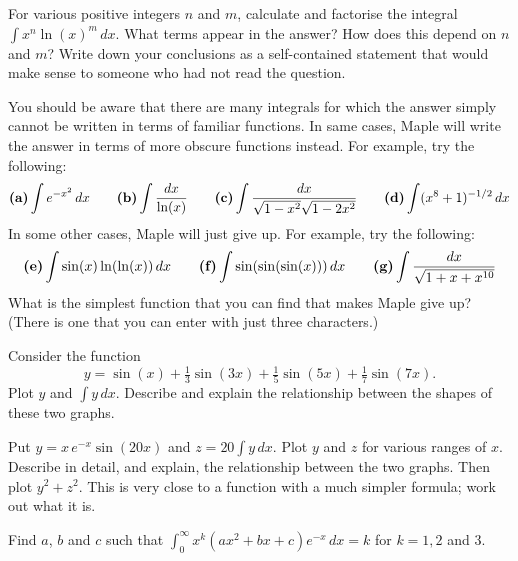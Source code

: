 \documentclass[a4paper,10pt]{amsbook}
\numberwithin{example}{chapter}
\begin{document}
\begin{exercise}
 For various positive integers $n$ and $m$, calculate and
 factorise the integral $\int x^n\ln(x)^m\,dx$.  What terms
 appear in the answer?  How does this depend on $n$ and $m$?
 Write down your conclusions as a self-contained statement
 that would make sense to someone who had not read the
 question. 
\end{exercise}

\begin{exercise}
 You should be aware that there are many integrals for which
 the answer simply cannot be written in terms of familiar
 functions.  In same cases, Maple will write the answer in
 terms of more obscure functions instead.  For example, try
 the following:
 \[ \text{\bf (a)} \int e^{-x^2}\,dx \hspace{2em}
    \text{\bf (b)} \int \frac{dx}{\ln(x)} \hspace{2em}
    \text{\bf (c)} \int \frac{dx}{\sqrt{1-x^2}\sqrt{1-2x^2}} \hspace{2em}
    \text{\bf (d)} \int (x^8+1)^{-1/2}\,dx
 \]
 In some other cases, Maple will just give up.  For example,
 try the following:
 \[ \text{\bf (e)} \int \sin(x)\ln(\ln(x))\,dx \hspace{2em}
    \text{\bf (f)} \int \sin(\sin(\sin(x)))\,dx \hspace{2em}
    \text{\bf (g)} \int \frac{dx}{\sqrt{1+x+x^{10}}}
 \]
 What is the simplest function that you can find that makes
 Maple give up?  (There is one that you can enter with just
 three characters.)
\end{exercise}

\begin{exercise}
 Consider the function
 \[ y = \sin(x) + \tfrac{1}{3}\sin(3x) +
        \tfrac{1}{5}\sin(5x) + \tfrac{1}{7}\sin(7x).
 \]
 Plot $y$ and $\int y\,dx$.  Describe and explain the
 relationship between the shapes of these two graphs.
\end{exercise}

\begin{exercise}
 Put $y=x\,e^{-x}\sin(20x)$ and $z=20 \int y\,dx$.  Plot $y$ and
 $z$ for various ranges of $x$.  Describe in detail, and
 explain, the relationship between the two graphs.  Then
 plot $y^2+z^2$.  This is very close to a function with a
 much simpler formula; work out what it is.
\end{exercise}

\begin{exercise}
 Find $a$, $b$ and $c$ such that
 $\int_0^\infty x^k(ax^2+bx+c)e^{-x}\,dx=k$ for $k=1,2$ and $3$.
\end{exercise}
\end{document}
